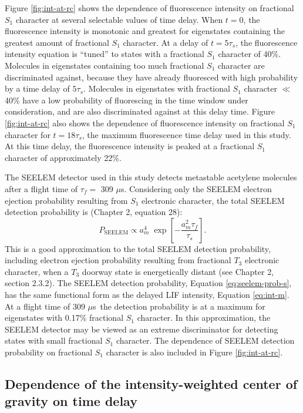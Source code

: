 \documentclass[12pt]{mitthesis}
\newcommand{\microsec}{$\mu$s}
\begin{document}
Figure \ref{fig:int-at-rc} shows the dependence of fluorescence
intensity on fractional $S_1$ character at several selectable
values of time delay.  When $t = 0$, the fluorescence intensity is
monotonic and greatest for eigenstates containing the greatest amount
of fractional $S_1$ character.  At a delay of $t = 5 \tau_s$,
the fluorescence intensity equation is ``tuned'' to states with a
fractional $S_1$ character of 40\%.  Molecules in eigenstates
containing too much fractional $S_1$ character are
discriminated against, because they have already fluoresced with high
probability by a time delay of $5 \tau_s$.  Molecules in eigenstates
with fractional $S_1$ character $\ll$ 40\% have a low
probability of fluorescing in the time window under consideration, and
are also discriminated against at this delay time.  Figure
\ref{fig:int-at-rc} also shows the dependence of fluorescence
intensity on fractional $S_1$ character for $t=18\tau_s$, the
maximum fluorescence time delay used in this study.  At this time
delay, the fluorescence intensity is peaked at a fractional $S_1$
character of approximately 22\%.

The SEELEM detector used in this study detects metastable acetylene
molecules after a flight time of $\tau_f =$ 309
\microsec.  Considering only the SEELEM electron ejection probability
resulting from $S_1$ electronic character, the total SEELEM detection
probability is (Chapter 2, equation 28):
\begin{equation}
  \label{eq:seelem-prob-s}
  P_{\text{SEELEM}} \propto 
    a_m^4 \; 
    \exp \left [ 
      -\frac{a_m^2 \tau_f}{\tau_s} 
    \right ].
\end{equation}
This is a good approximation to the total SEELEM detection
probability, including electron ejection probability resulting from
fractional $T_3$ electronic character, when a $T_3$ doorway state is
energetically distant (see Chapter 2, section 2.3.2).  The SEELEM
detection probability, Equation \ref{eq:seelem-prob-s}, has the same
functional form as the delayed LIF intensity, Equation \ref{eq:int-m}.
At a flight time of 309 \microsec\, the detection probability is at a
maximum for eigenstates with 0.17\% fractional $S_1$ character.  In
this approximation, the SEELEM detector may be viewed as an extreme
discriminator for detecting states with small fractional $S_1$
character.  The dependence of SEELEM detection probability on
fractional $S_1$ character is also included in Figure
\ref{fig:int-at-rc}.




\subsection{Dependence of the intensity-weighted center of gravity on
  time delay}
\end{document}
